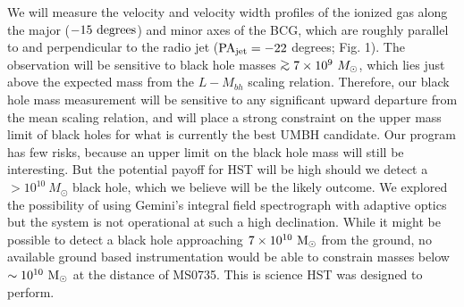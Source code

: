 \documentclass[12pt]{article}
\begin{document}
We will measure the velocity and velocity width profiles of the ionized gas along the major ($-15~\rm degrees$) and minor axes of the BCG, which are
roughly parallel to and perpendicular to the radio jet ($\rm PA_{jet}= - 22$ degrees; Fig. 1).  The observation will be sensitive to black hole masses
 $\gae 7\times 10^9~M_{\odot}$, which lies just above the expected mass from the $L-M_{bh}$ scaling relation.
Therefore, our black hole mass measurement will be sensitive to any significant upward departure from the mean scaling relation,
and will place a strong constraint on the upper mass limit of black holes for what is currently
the best UMBH candidate.  Our program has few risks, because an upper limit on the black hole mass will still be interesting.
But the potential payoff for HST will be high should we detect a $>10^{10}~M_\odot$ black hole, which we believe will be the likely outcome.  
We explored the possibility of using Gemini's integral field spectrograph with adaptive optics but
the system is not operational at such a high declination.  While it might be possible to detect a black hole approaching
$7\times 10^{10}~\rm M_\odot$ from the ground, no available ground based instrumentation would be able to constrain masses
below $\sim 10^{10}~\rm M_\odot$ at the distance of MS0735.  This is science HST was designed to perform.
\end{document}

